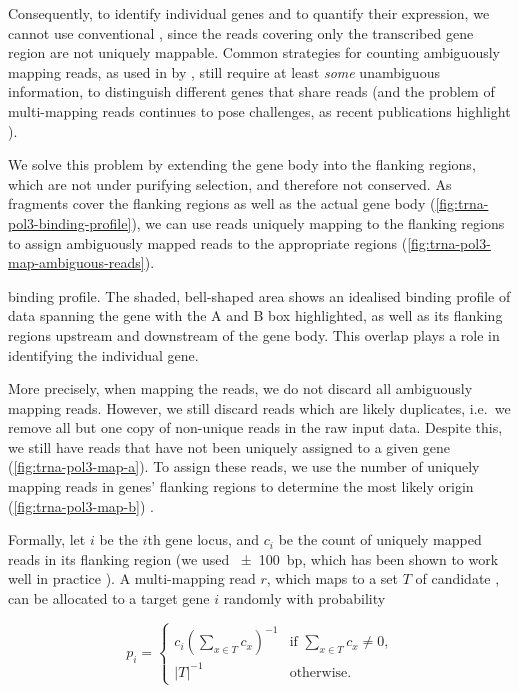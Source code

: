Consequently, to identify individual \trna genes and to quantify their
expression, we cannot use conventional \rnaseq, since the \rna reads covering
only the transcribed gene region are not uniquely mappable. Common strategies
for counting ambiguously mapping reads, as used in  by
\citet{Mortazavi:2008}, still require at least \emph{some} unambiguous
information, to distinguish different genes that share reads (and the problem of
multi-mapping reads continues to pose challenges, as recent publications
highlight \citep{Kahles:2015}).

We solve this problem by extending the \trna gene body into the flanking
regions, which are not under purifying selection, and therefore not conserved.
As  \chipseq fragments cover the flanking regions as well as the actual
gene body (\cref{fig:trna-pol3-binding-profile}), we can use reads uniquely
mapping to the flanking regions to assign ambiguously mapped reads to the
appropriate regions (\cref{fig:trna-pol3-map-ambiguous-reads}).

    {\trna {} \chip binding profile.}
    {The shaded, bell-shaped area shows an idealised binding profile of \chipseq
    data spanning the \trna gene with the A and B box highlighted, as well as
    its flanking regions upstream and downstream of the gene body. This overlap
    plays a role in identifying the individual gene.}

More precisely, when mapping the reads, we do not discard all ambiguously
mapping reads. However, we still discard reads which are likely \pcr duplicates,
i.e.\ we remove all but one copy of non-unique reads in the raw input data.
Despite this, we still have reads that have not been uniquely assigned to a
given \trna gene (\cref{fig:trna-pol3-map-a}). To assign these reads, we use the
number of uniquely mapping reads in \trna genes’ flanking regions to determine
the most likely origin (\cref{fig:trna-pol3-map-b}) \citep{Kutter:2011}.

Formally, let \(i\) be the \(i\)th \trna gene locus, and \(c_i\) be the count of
uniquely mapped reads in its flanking region (we used \SI{\pm100}{bp}, which has
been shown to work well in practice \citep{Kutter:2011}). A multi-mapping read
\(r\), which maps to a set \(T\) of candidate \trna[s], can be allocated to a
target \trna gene \(i\) randomly with probability

\begin{equation}
    p_i = \begin{cases}
        c_i\left(\sum_{x \in T}c_x\right)^{-1} &
            \text{if \(\sum_{x \in T}c_x \neq 0\),} \\
        \vert T \rvert^{-1} & \text{otherwise.}
    \end{cases}
\end{equation}


